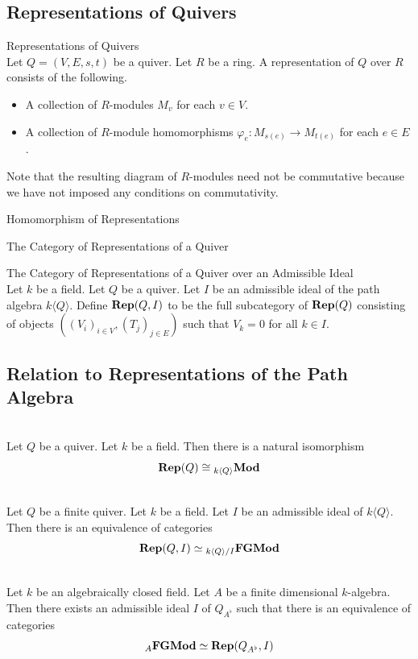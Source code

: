 \documentclass[a4paper]{article}
\begin{document}
\subsection{Representations of Quivers}
\begin{defn}{Representations of Quivers}{}\\
Let $Q=(V,E,s,t)$ be a quiver. Let $R$ be a ring. A representation of $Q$ over $R$ consists of the following. 
\begin{itemize}
\item A collection of $R$-modules $M_v$ for each $v\in V$. 
\item A collection of $R$-module homomorphisms $\varphi_e:M_{s(e)}\to M_{t(e)}$ for each $e\in E$. 
\end{itemize}
\end{defn}

Note that the resulting diagram of $R$-modules need not be commutative because we have not imposed any conditions on commutativity. 

\begin{defn}{Homomorphism of Representations}{}
\end{defn}

\begin{defn}{The Category of Representations of a Quiver}{}
\end{defn}

\begin{defn}{The Category of Representations of a Quiver over an Admissible Ideal}{}\\
Let $k$ be a field. Let $Q$ be a quiver. Let $I$ be an admissible ideal of the path algebra $k\langle Q\rangle$. Define $\bold{Rep}(Q,I)$ to be the full subcategory of $\bold{Rep}(Q)$ consisting of objects $((V_i)_{i\in V},(T_j)_{j\in E})$ such that $V_k=0$ for all $k\in I$. 
\end{defn}

\subsection{Relation to Representations of the Path Algebra}
\begin{prp}{}{}\\
Let $Q$ be a quiver. Let $k$ be a field. Then there is a natural isomorphism $$\bold{Rep}(Q)\cong{_{k\langle Q\rangle}}\bold{Mod}$$
\end{prp}

\begin{prp}{}{}\\
Let $Q$ be a finite quiver. Let $k$ be a field. Let $I$ be an admissible ideal of $k\langle Q\rangle$. Then there is an equivalence of categories $$\bold{Rep}(Q,I)\simeq{_{k\langle Q\rangle/I}}\bold{FGMod}$$
\end{prp}

\begin{crl}{}{}\\
Let $k$ be an algebraically closed field. Let $A$ be a finite dimensional $k$-algebra. Then there exists an admissible ideal $I$ of $Q_{A^\flat}$ such that there is an equivalence of categories $${_A}\bold{FGMod}\simeq\bold{Rep}(Q_{A^\flat},I)$$
\end{crl}
\end{document}

